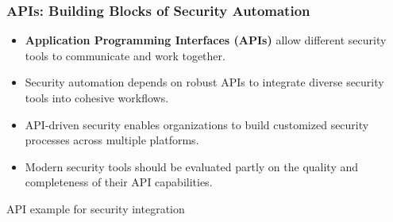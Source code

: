 \documentclass{beamer}
\begin{document}
\begin{frame}[fragile]
  \frametitle{APIs: Building Blocks of Security Automation}
  
  \begin{itemize}
    \item \textbf{Application Programming Interfaces (APIs)} allow different security tools to communicate and work together.
    \item Security automation depends on robust APIs to integrate diverse security tools into cohesive workflows.
    \item API-driven security enables organizations to build customized security processes across multiple platforms.
    \item Modern security tools should be evaluated partly on the quality and completeness of their API capabilities.
  \end{itemize}
  
  \begin{block}{API example for security integration}
    \tiny
  \end{block}
\end{frame}
\end{document}
